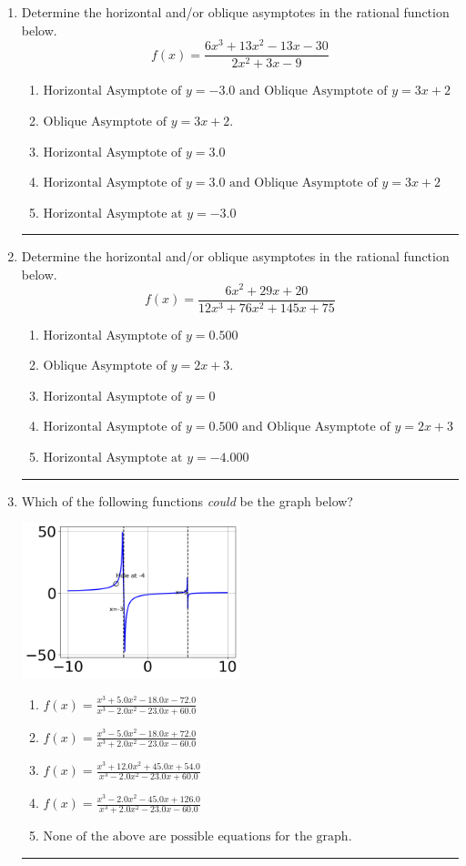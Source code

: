 \documentclass[14pt]{extbook}
\newcommand{\litem}[1]{\item#1\hspace*{-1cm}\rule{\textwidth}{0.4pt}}
\begin{document}
\begin{enumerate}
{\begin{enumerate}[label=\Alph*.]
\end{enumerate} }
\litem{
Determine the horizontal and/or oblique asymptotes in the rational function below.\[ f(x) = \frac{6x^{3} +13 x^{2} -13 x -30}{2x^{2} +3 x -9} \]\begin{enumerate}[label=\Alph*.]
\item \( \text{Horizontal Asymptote of } y = -3.0 \text{ and Oblique Asymptote of } y = 3x + 2 \)
\item \( \text{Oblique Asymptote of } y = 3x + 2. \)
\item \( \text{Horizontal Asymptote of } y = 3.0  \)
\item \( \text{Horizontal Asymptote of } y = 3.0 \text{ and Oblique Asymptote of } y = 3x + 2 \)
\item \( \text{Horizontal Asymptote at } y = -3.0 \)

\end{enumerate} }
\litem{
Determine the horizontal and/or oblique asymptotes in the rational function below.\[ f(x) = \frac{6x^{2} +29 x + 20}{12x^{3} +76 x^{2} +145 x + 75} \]\begin{enumerate}[label=\Alph*.]
\item \( \text{Horizontal Asymptote of } y = 0.500  \)
\item \( \text{Oblique Asymptote of } y = 2x + 3. \)
\item \( \text{Horizontal Asymptote of } y = 0 \)
\item \( \text{Horizontal Asymptote of } y = 0.500 \text{ and Oblique Asymptote of } y = 2x + 3 \)
\item \( \text{Horizontal Asymptote at } y = -4.000 \)

\end{enumerate} }
\litem{
Which of the following functions \textit{could} be the graph below?
\begin{center}
    \includegraphics[width=0.5\textwidth]{../Figures/identifyGraphOfRationalFunctionCopyA.png}
\end{center}
\begin{enumerate}[label=\Alph*.]
\item \( f(x)=\frac{x^{3} +5.0 x^{2} -18.0 x -72.0}{x^{3} -2.0 x^{2} -23.0 x + 60.0} \)
\item \( f(x)=\frac{x^{3} -5.0 x^{2} -18.0 x + 72.0}{x^{3} +2.0 x^{2} -23.0 x -60.0} \)
\item \( f(x)=\frac{x^{3} +12.0 x^{2} +45.0 x + 54.0}{x^{3} -2.0 x^{2} -23.0 x + 60.0} \)
\item \( f(x)=\frac{x^{3} -2.0 x^{2} -45.0 x + 126.0}{x^{3} +2.0 x^{2} -23.0 x -60.0} \)
\item \( \text{None of the above are possible equations for the graph.} \)


\end{enumerate}}
\end{enumerate}
\end{document}
